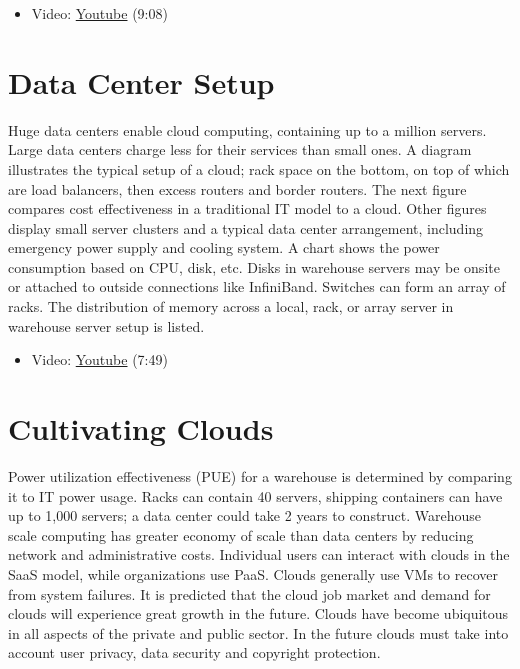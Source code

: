 \begin{itemize}

\item
  Video: \href{https://www.youtube.com/watch?v=cwtWpZcWuQ0}{Youtube}
  (9:08)
\end{itemize}

\section{Data Center Setup}\label{data-center-setup}

Huge data centers enable cloud computing, containing up to a million
servers. Large data centers charge less for their services than small
ones. A diagram illustrates the typical setup of a cloud; rack space on
the bottom, on top of which are load balancers, then excess routers and
border routers. The next figure compares cost effectiveness in a
traditional IT model to a cloud. Other figures display small server
clusters and a typical data center arrangement, including emergency
power supply and cooling system. A chart shows the power consumption
based on CPU, disk, etc. Disks in warehouse servers may be onsite or
attached to outside connections like InfiniBand. Switches can form an
array of racks. The distribution of memory across a local, rack, or
array server in warehouse server setup is listed.

\begin{itemize}

\item
  Video: \href{https://www.youtube.com/watch?v=zBVtXzqF2ew}{Youtube}
  (7:49)
\end{itemize}

\section{Cultivating Clouds}\label{cultivating-clouds}

Power utilization effectiveness (PUE) for a warehouse is determined by
comparing it to IT power usage. Racks can contain 40 servers, shipping
containers can have up to 1,000 servers; a data center could take 2
years to construct. Warehouse scale computing has greater economy of
scale than data centers by reducing network and administrative costs.
Individual users can interact with clouds in the SaaS model, while
organizations use PaaS. Clouds generally use VMs to recover from system
failures. It is predicted that the cloud job market and demand for
clouds will experience great growth in the future. Clouds have become
ubiquitous in all aspects of the private and public sector. In the
future clouds must take into account user privacy, data security and
copyright protection.

